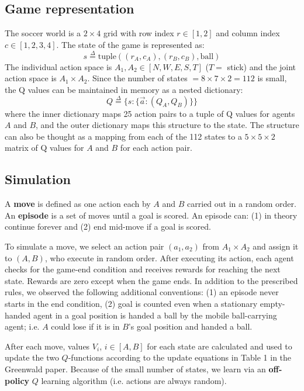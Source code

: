\documentclass[conference]{IEEEtran}
\begin{document}
\subsection{Game representation}
The soccer world is a $2\times 4$ grid with row index $r\in [1,2]$ and column index $c\in [1,2,3,4]$. The state of the game is represented as:
\begin{equation}
s \stackrel{\Delta}{=} \text{tuple}((r_A,c_A), (r_B,c_B), \text{ball})
\end{equation}
The individual action space is $A_1, A_2 \in [N, W, E, S, T]$ ($T=$ stick) and the joint action space is $A_1\times A_2$. Since the number of states $ = 8\times 7\times 2 = 112$ is small, the Q values can be maintained in memory as a nested dictionary:
\begin{equation}
Q \stackrel{\Delta}{=} \{s: \{\vec{a}: (Q_A, Q_B)\}\} 
\end{equation}
where the inner dictionary maps 25 action pairs to a tuple of Q values for agents $A$ and $B$, and the outer dictionary maps this structure to the state. The structure can also be thought as a mapping from each of the 112 states to a $5\times 5\times 2$ matrix of Q values for $A$ and $B$ for each action pair. 
\subsection{Simulation}
A {\bf move} is defined as one action each by $A$ and $B$ carried out in a random order. An {\bf episode} is a set of moves until a goal is scored. An episode can: (1) in theory continue forever and (2) end mid-move if a goal is scored.

To simulate a move, we select an action pair $(a_1, a_2)$ from $A_1\times A_2$ and assign it to $(A, B)$, who execute in random order. After executing its action, each agent checks for the game-end condition and receives rewards for reaching the next state. Rewards are zero except when the game ends. In addition to the prescribed rules, we observed the following additional conventions: (1) an episode never starts in the end condition, (2) goal is counted even when a stationary empty-handed agent in a goal position is handed a ball by the mobile ball-carrying agent; i.e. $A$ could lose if it is in $B$'s goal position and handed a ball.

After each move, values $V_i$, $i\in [A,B]$ for each state are calculated and used to update the two $Q$-functions according to the update equations in Table 1 in the Greenwald paper. Because of the small number of states, we learn via an {\bf off-policy} $Q$ learning algorithm (i.e. actions are always random).
\end{document}
